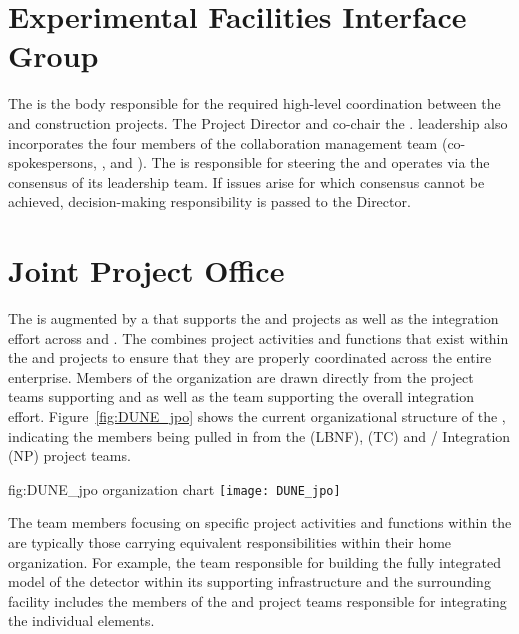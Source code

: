 \section{Experimental Facilities Interface Group}
\label{sec:efig}

The  is the body responsible for the required high-level
coordination between the  and  construction 
projects.  The  Project Director and  
co-chair the .   leadership also incorporates 
the four members of the  collaboration management 
team (co-spokespersons, , and ).  The
 is responsible for steering the  
and operates via the consensus of its leadership team.  If issues 
arise for which consensus cannot be achieved, decision-making 
responsibility is passed to the  Director.

\section{Joint Project Office}
\label{sec:jpo}

The  is augmented by a  that supports the
 and  projects as well as the integration
effort across  and . The  combines
project activities and functions that exist within the  and 
projects to ensure that they are properly coordinated across the
entire enterprise.  Members of the  organization are drawn directly
from the project teams supporting  and  as well as the team
supporting the overall integration effort.  Figure~\ref{fig:DUNE_jpo} shows the
current organizational structure of the , indicating the members
being pulled in from the  (LBNF),  (TC) and /
Integration (NP) project teams.
\begin{dunefigure}{fig:DUNE_jpo}
  { organization chart}
  \texttt{[image: DUNE\_jpo]}
\end{dunefigure}
The team members focusing on specific project activities and functions
within the  are typically those carrying equivalent
responsibilities within their home organization.  For example, the
 team responsible for building the fully integrated model
of the detector within its supporting infrastructure and the
surrounding facility includes the members of the  and
 project teams responsible for integrating the individual
elements.

